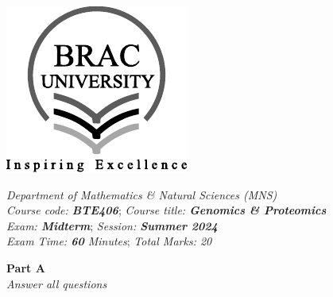 \documentclass[12pt]{exam}
\newcommand{\courseDepartment}{Department of Mathematics \& Natural Sciences (MNS)}
\newcommand{\courseCode}{BTE406}
\newcommand{\courseTitle}{Genomics \& Proteomics}
\newcommand{\courseExam}{Midterm}
\newcommand{\courseSession}{Summer 2024}
\newcommand{\examMarks}{20}
\newcommand{\examTime}{60}
\begin{document}
\begin{minipage}{0.125\textwidth}
    \includegraphics[width=\textwidth]{bracu_logo_ai.pdf}
\end{minipage}
\hfill
\begin{minipage}{0.8\textwidth}
    \begin{center}
        \emph{\courseDepartment} \\
        \emph{Course code: \textbf{\courseCode}};  
        \emph{Course title: \textbf{\courseTitle}} \\
        \emph{Exam: \textbf{\courseExam}}; \emph{Session: \textbf{\courseSession}} \\
        \emph{Exam Time: \textbf{\examTime} Minutes}; 
        \emph{Total Marks: \examMarks} 
    \end{center}
\end{minipage}

\begin{center}\textbf{Part A} \\
\textit{Answer all questions}\end{center}
\end{document}
